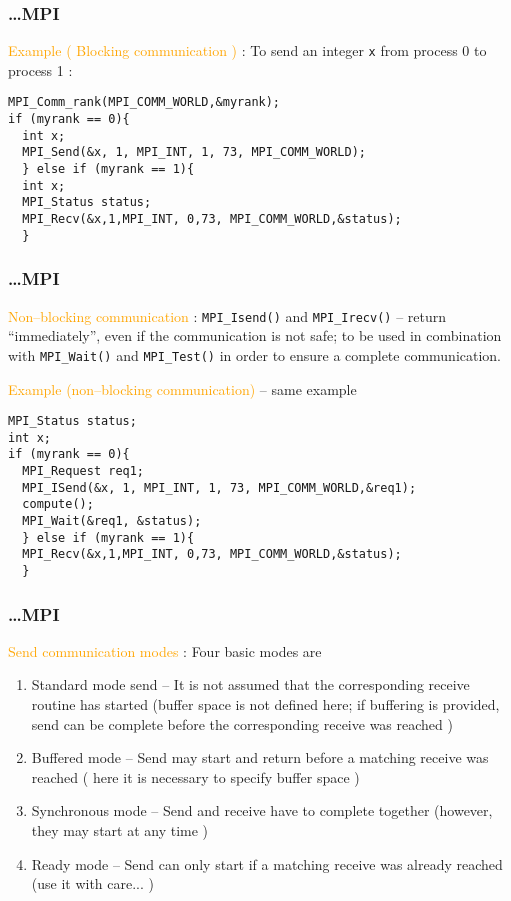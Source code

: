 \documentclass{beamer}
\begin{document}
\begin{frame}[fragile]
\frametitle{\ldots MPI}

\textcolor{orange}{Example ( Blocking communication )} : To send
an integer \texttt{x} from process 0 to process 1 :

\begin{lstlisting}
MPI_Comm_rank(MPI_COMM_WORLD,&myrank);
if (myrank == 0){
  int x;
  MPI_Send(&x, 1, MPI_INT, 1, 73, MPI_COMM_WORLD);
  } else if (myrank == 1){
  int x;
  MPI_Status status;
  MPI_Recv(&x,1,MPI_INT, 0,73, MPI_COMM_WORLD,&status);
  }
\end{lstlisting}
\end{frame}

\begin{frame}[fragile]
\frametitle{\ldots MPI}
\small
\textcolor{orange}{Non--blocking communication} : \texttt{MPI\_Isend()}
and \texttt{MPI\_Irecv()} -- return ``immediately'', even if the
communication is not safe; to be used in combination with
\texttt{MPI\_Wait()} and \texttt{MPI\_Test()} in order to ensure
a complete communication.

\textcolor{orange}{Example (non--blocking communication)} -- same example

\begin{lstlisting}
MPI_Status status;
int x;
if (myrank == 0){
  MPI_Request req1;
  MPI_ISend(&x, 1, MPI_INT, 1, 73, MPI_COMM_WORLD,&req1);
  compute();
  MPI_Wait(&req1, &status);
  } else if (myrank == 1){
  MPI_Recv(&x,1,MPI_INT, 0,73, MPI_COMM_WORLD,&status);
  }
\end{lstlisting}

\end{frame}

\begin{frame}
\frametitle{\ldots MPI}

\textcolor{orange}{Send communication modes} : Four basic modes are
\begin{enumerate}
\item \alert{Standard mode send} -- It is not assumed that the
corresponding receive routine has started (buffer space is not
defined here; if buffering is provided, send can be complete
before the corresponding receive was reached )
\item \alert{Buffered mode} -- Send may start and return before
a matching receive was reached ( here it is necessary to specify
buffer space )
\item \alert{Synchronous mode} -- Send and receive have to complete
together (however, they may start at any time )
\item \alert{Ready mode} -- Send can only start if a matching
receive was already reached (use it with care... )
\end{enumerate}
\end{frame}
\end{document}
